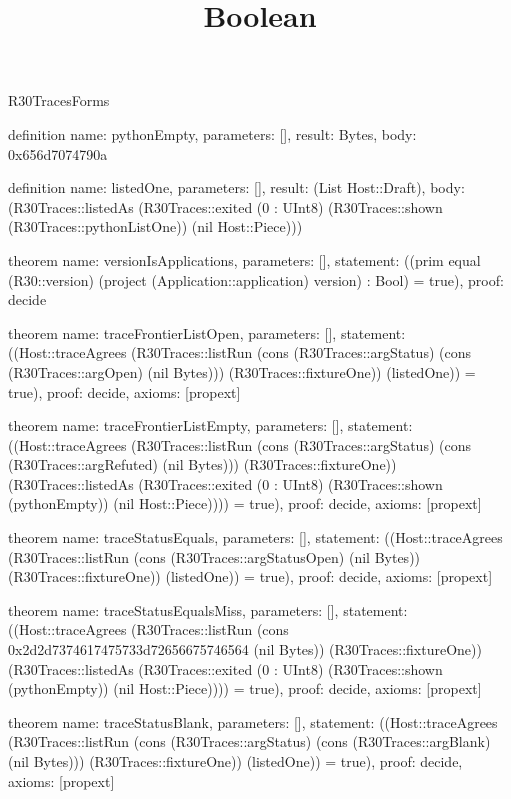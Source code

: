 \begin{lexlean}{R30TracesForms}
\title{Boolean}
\begin{semanticmodule}
definition{
  name: pythonEmpty,
  parameters: [],
  result: Bytes,
  body: 0x656d7074790a
}

definition{
  name: listedOne,
  parameters: [],
  result: (List Host::Draft),
  body: (R30Traces::listedAs (R30Traces::exited (0 : UInt8) (R30Traces::shown (R30Traces::pythonListOne)) (nil Host::Piece)))
}

theorem{
  name: versionIsApplications,
  parameters: [],
  statement: ((prim equal (R30::version) (project (Application::application) version) : Bool) = true),
  proof: decide{}
}

theorem{
  name: traceFrontierListOpen,
  parameters: [],
  statement: ((Host::traceAgrees (R30Traces::listRun (cons (R30Traces::argStatus) (cons (R30Traces::argOpen) (nil Bytes))) (R30Traces::fixtureOne)) (listedOne)) = true),
  proof: decide{},
  axioms: [propext]
}

theorem{
  name: traceFrontierListEmpty,
  parameters: [],
  statement: ((Host::traceAgrees (R30Traces::listRun (cons (R30Traces::argStatus) (cons (R30Traces::argRefuted) (nil Bytes))) (R30Traces::fixtureOne)) (R30Traces::listedAs (R30Traces::exited (0 : UInt8) (R30Traces::shown (pythonEmpty)) (nil Host::Piece)))) = true),
  proof: decide{},
  axioms: [propext]
}

theorem{
  name: traceStatusEquals,
  parameters: [],
  statement: ((Host::traceAgrees (R30Traces::listRun (cons (R30Traces::argStatusOpen) (nil Bytes)) (R30Traces::fixtureOne)) (listedOne)) = true),
  proof: decide{},
  axioms: [propext]
}

theorem{
  name: traceStatusEqualsMiss,
  parameters: [],
  statement: ((Host::traceAgrees (R30Traces::listRun (cons 0x2d2d7374617475733d72656675746564 (nil Bytes)) (R30Traces::fixtureOne)) (R30Traces::listedAs (R30Traces::exited (0 : UInt8) (R30Traces::shown (pythonEmpty)) (nil Host::Piece)))) = true),
  proof: decide{},
  axioms: [propext]
}

theorem{
  name: traceStatusBlank,
  parameters: [],
  statement: ((Host::traceAgrees (R30Traces::listRun (cons (R30Traces::argStatus) (cons (R30Traces::argBlank) (nil Bytes))) (R30Traces::fixtureOne)) (listedOne)) = true),
  proof: decide{},
  axioms: [propext]
}


\end{semanticmodule}
\end{lexlean}
